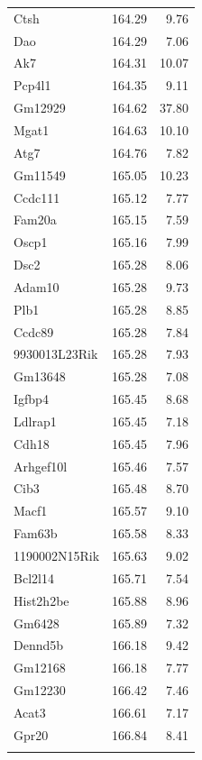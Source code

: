 \documentclass[oneside]{book}\usepackage[]{graphicx}\usepackage[]{color}
\begin{document}
\begin{appendices}
{\begin{longtable}{lrr}
  Ctsh & 164.29 & 9.76 \\
  Dao & 164.29 & 7.06 \\
  Ak7 & 164.31 & 10.07 \\
  Pcp4l1 & 164.35 & 9.11 \\
  Gm12929 & 164.62 & 37.80 \\
  Mgat1 & 164.63 & 10.10 \\
  Atg7 & 164.76 & 7.82 \\
  Gm11549 & 165.05 & 10.23 \\
  Ccdc111 & 165.12 & 7.77 \\
  Fam20a & 165.15 & 7.59 \\
  Oscp1 & 165.16 & 7.99 \\
  Dsc2 & 165.28 & 8.06 \\
  Adam10 & 165.28 & 9.73 \\
  Plb1 & 165.28 & 8.85 \\
  Ccdc89 & 165.28 & 7.84 \\
  9930013L23Rik & 165.28 & 7.93 \\
  Gm13648 & 165.28 & 7.08 \\
  Igfbp4 & 165.45 & 8.68 \\
  Ldlrap1 & 165.45 & 7.18 \\
  Cdh18 & 165.45 & 7.96 \\
  Arhgef10l & 165.46 & 7.57 \\
  Cib3 & 165.48 & 8.70 \\
  Macf1 & 165.57 & 9.10 \\
  Fam63b & 165.58 & 8.33 \\
  1190002N15Rik & 165.63 & 9.02 \\
  Bcl2l14 & 165.71 & 7.54 \\
  Hist2h2be & 165.88 & 8.96 \\
  Gm6428 & 165.89 & 7.32 \\
  Dennd5b & 166.18 & 9.42 \\
  Gm12168 & 166.18 & 7.77 \\
  Gm12230 & 166.42 & 7.46 \\
  Acat3 & 166.61 & 7.17 \\
  Gpr20 & 166.84 & 8.41 \\
   \hline
  
  \label{tab:hot-annot}


\end{longtable}}
\end{appendices}
\end{document}
